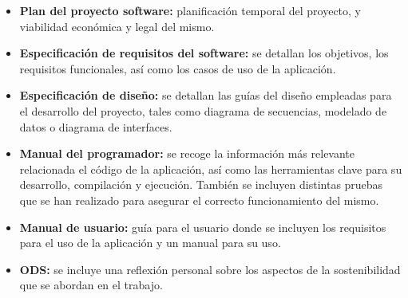 \begin{itemize}
\tightlist
\item
  \textbf{Plan del proyecto software:} planificación temporal del proyecto, y viabilidad económica y legal del mismo.
\item
  \textbf{Especificación de requisitos del software:} se detallan los objetivos, los requisitos funcionales, así como los casos de uso de la aplicación.
\item
  \textbf{Especificación de diseño:} se detallan las guías del diseño empleadas para el desarrollo del proyecto, tales como diagrama de secuencias, modelado de datos o diagrama de interfaces.
\item
  \textbf{Manual del programador:} se recoge la información más relevante relacionada el código de la aplicación, así como las herramientas clave para su desarrollo, compilación y ejecución. También se incluyen distintas pruebas que se han realizado para asegurar el correcto funcionamiento del mismo.
\item
  \textbf{Manual de usuario:} guía para el usuario donde se incluyen los requisitos para el uso de la aplicación y un manual para su uso.
\item
  \textbf{ODS:} se incluye una reflexión personal sobre los aspectos de la sostenibilidad que se abordan en el trabajo.
\end{itemize}






